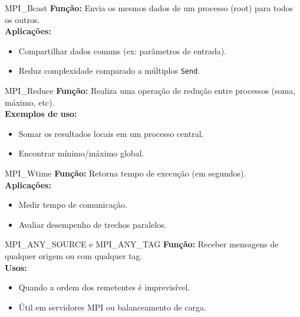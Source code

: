 \documentclass{beamer}
\begin{document}
\begin{frame}{MPI\_Bcast}
\textbf{Função:} Envia os mesmos dados de um processo (root) para todos os outros. \\
\textbf{Aplicações:}
\begin{itemize}
    \item Compartilhar dados comuns (ex: parâmetros de entrada).
    \item Reduz complexidade comparado a múltiplos \texttt{Send}.
\end{itemize}
\end{frame}

\begin{frame}{MPI\_Reduce}
\textbf{Função:} Realiza uma operação de redução entre processos (soma, máximo, etc). \\
\textbf{Exemplos de uso:}
\begin{itemize}
    \item Somar os resultados locais em um processo central.
    \item Encontrar mínimo/máximo global.
\end{itemize}
\end{frame}

\begin{frame}{MPI\_Wtime}
\textbf{Função:} Retorna tempo de execução (em segundos). \\
\textbf{Aplicações:}
\begin{itemize}
    \item Medir tempo de comunicação.
    \item Avaliar desempenho de trechos paralelos.
\end{itemize}
\end{frame}

\begin{frame}{MPI\_ANY\_SOURCE e MPI\_ANY\_TAG}
\textbf{Função:} Receber mensagens de qualquer origem ou com qualquer tag. \\
\textbf{Usos:}
\begin{itemize}
    \item Quando a ordem dos remetentes é imprevisível.
    \item Útil em servidores MPI ou balanceamento de carga.
\end{itemize}
\end{frame}
\end{document}
